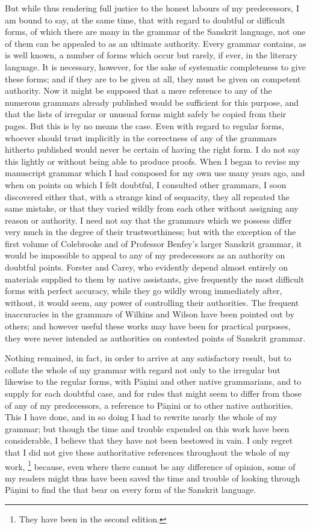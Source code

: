 But while thus rendering full justice to the honest labours of my
predecessors, I am bound to say, at the same time, that with regard to
doubtful or difficult forms, of which there are many in the grammar of
the Sanskrit language, not one of them can be appealed to as an ultimate
authority. Every grammar contains, as is well known, a number of forms
which occur but rarely, if ever, in the literary language. It is
necessary, however, for the sake of systematic completeness to give
these forms; and if they are to be given at all, they must be given on
competent authority. Now it might be supposed that a mere reference to
any of the numerous grammars already published would be sufficient for
this purpose, and that the lists of irregular or unusual forms might
safely be copied from their pages. But this is by no means the case.
Even with regard to regular forms, whoever should trust implicitly in
the correctness of any of the grammars hitherto published would never be
certain of having the right form. I do not say this lightly or without
being able to produce proofs. When I began to revise my manuscript
grammar which I had composed for my own use many years ago, and when on
points on which I felt doubtful, I consulted other grammars, I soon
discovered either that, with a strange kind of sequacity, they all
repeated the same mistake, or that they varied wildly from each other
without assigning any reason or authority. I need not say that the
grammars which we possess differ very much in the degree of their
trustworthiness; but with the exception of the first volume of
Colebrooke and of Professor Benfey's larger Sanskrit grammar, it would
be impossible to appeal to any of my predecessors as an authority on
doubtful points. Forster and Carey, who evidently depend almost entirely
on materials supplied to them by native assistants, give frequently the
most difficult forms with perfect accuracy, while they go wildly wrong
immediately after, without, it would seem, any power of controlling
their authorities. The frequent inaccuracies in the grammars of Wilkins
and Wilson have been pointed out by others; and however useful these
works may have been for practical purposes, they were never intended as
authorities on contested points of Sanskrit grammar.

Nothing remained, in fact, in order to arrive at any satisfactory
result, but to collate the whole of my grammar with regard not only to
the irregular but likewise to the regular forms, with Pāṇini and other
native grammarians, and to supply for each doubtful case, and for rules
that might seem to differ from those of any of my predecessors, a
reference to Pāṇini or to other native authorities. This I have done,
and in so doing I had to rewrite nearly the whole of my grammar; but
though the time and trouble expended on this work have been
considerable, I believe that they have not been bestowed in vain. I only
regret that I did not give these authoritative references throughout the
whole of my work,%
\footnote{They have been in the second edition.}
because, even where there cannot be any difference of opinion, some of
my readers might thus have been saved the time and trouble of looking
through Pāṇini to find the  that bear on every form of the
Sanskrit language.

